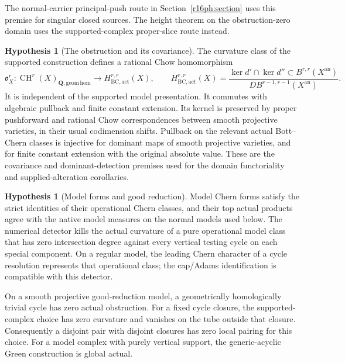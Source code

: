 \documentclass[11pt,a4paper]{article}
\theoremstyle{definition}
\newtheorem{hypothesis}[theorem]{Hypothesis}
\theoremstyle{remark}
\numberwithin{equation}{section}
\newcommand{\CH}{\operatorname{CH}}
\newcommand{\an}{\mathrm{an}}
\begin{document}
The normal-carrier principal-push route in Section~\ref{r16ph:section} uses this premise for singular closed sources. The height theorem on the obstruction-zero domain uses the supported-complex proper-slice route instead.

\begin{hypothesis}[The obstruction and its covariance]\label{hyp:height-covariance}
The curvature class of the supported construction defines a rational Chow homomorphism
\[
 \mathfrak o_X^r:\CH^r(X)_{\mathbf Q,\mathrm{geom\,hom}}
       \longrightarrow H^{r,r}_{\mathrm{BC,act}}(X),\qquad
 H^{r,r}_{\mathrm{BC,act}}(X)=
 \frac{\ker d'\cap\ker d''\subset B^{r,r}(X^{\an})}
      {D B^{r-1,r-1}(X^{\an})}.
\]
It is independent of the supported model presentation. It commutes with algebraic pullback and finite constant extension. Its kernel is preserved by proper pushforward and rational Chow correspondences between smooth projective varieties, in their usual codimension shifts. Pullback on the relevant actual Bott--Chern classes is injective for dominant maps of smooth projective varieties, and for finite constant extension with the original absolute value. These are the covariance and dominant-detection premises used for the domain functoriality and supplied-alteration corollaries.
\end{hypothesis}

\begin{hypothesis}[Model forms and good reduction]\label{hyp:height-model}
Model Chern forms satisfy the strict identities of their operational Chern classes, and their top actual products agree with the native model measures on the normal models used below. The numerical detector kills the actual curvature of a pure operational model class that has zero intersection degree against every vertical testing cycle on each special component. On a regular model, the leading Chern character of a cycle resolution represents that operational class; the cap/Adams identification is compatible with this detector.

On a smooth projective good-reduction model, a geometrically homologically trivial cycle has zero actual obstruction. For a fixed cycle closure, the supported-complex choice has zero curvature and vanishes on the tube outside that closure. Consequently a disjoint pair with disjoint closures has zero local pairing for this choice. For a model complex with purely vertical support, the generic-acyclic Green construction is global actual.
\end{hypothesis}
\end{document}
